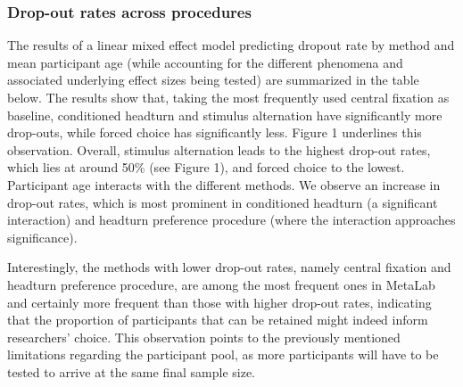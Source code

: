 \documentclass[english,floatsintext,man]{apa6}
\begin{document}
\subsubsection{Drop-out rates across
procedures}\label{drop-out-rates-across-procedures}

The results of a linear mixed effect model predicting dropout rate by
method and mean participant age (while accounting for the different
phenomena and associated underlying effect sizes being tested) are
summarized in the table below. The results show that, taking the most
frequently used central fixation as baseline, conditioned headturn and
stimulus alternation have significantly more drop-outs, while forced
choice has significantly less. Figure 1 underlines this observation.
Overall, stimulus alternation leads to the highest drop-out rates, which
lies at around 50\% (see Figure 1), and forced choice to the lowest.
Participant age interacts with the different methods. We observe an
increase in drop-out rates, which is most prominent in conditioned
headturn (a significant interaction) and headturn preference procedure
(where the interaction approaches significance).

Interestingly, the methods with lower drop-out rates, namely central
fixation and headturn preference procedure, are among the most frequent
ones in MetaLab and certainly more frequent than those with higher
drop-out rates, indicating that the proportion of participants that can
be retained might indeed inform researchers' choice. This observation
points to the previously mentioned limitations regarding the participant
pool, as more participants will have to be tested to arrive at the same
final sample size.
\end{document}
